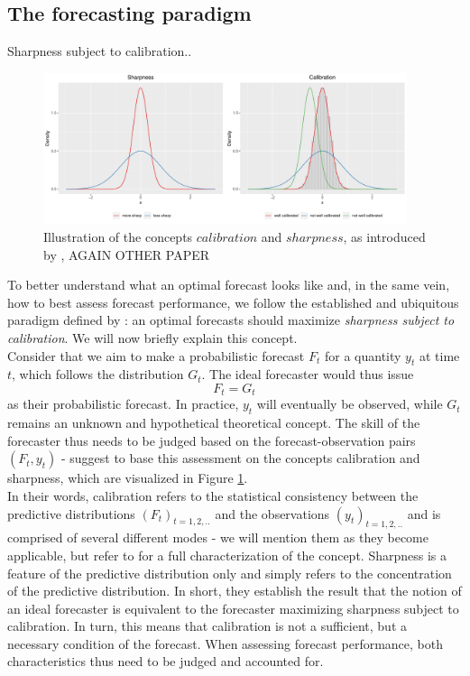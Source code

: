 \subsection{The forecasting paradigm}
Sharpness subject to calibration.\cite{ray_ensemble_2020}.
\begin{figure}
\centering
\includegraphics[width = 0.95\textwidth]{../plots/sharp_calib.pdf}
\caption{Illustration of the concepts $calibration$ and $sharpness$, as introduced by \cite{gneiting_strictly_2007}, AGAIN OTHER PAPER}
\label{fig:sharpcalib}
\end{figure}
To better understand what an optimal forecast looks like and, in the same vein, how to best assess forecast performance, we follow the established and ubiquitous paradigm defined by \cite{gneiting_probabilistic_2007}: an optimal forecasts should maximize \textit{sharpness subject to calibration}. We will now briefly explain this concept.\\
Consider that we aim to make a probabilistic forecast $F_t$ for a quantity $y_t$ at time $t$, which follows the distribution $G_t$. The ideal forecaster would thus issue 
\begin{equation}
	F_t = G_t
\end{equation}
as their probabilistic forecast. In practice, $y_t$ will eventually be observed, while $G_t$ remains an unknown and hypothetical theoretical concept. The skill of the forecaster thus needs to be judged based on the forecast-observation pairs $(F_t, y_t)$ - \cite{gneiting_probabilistic_2007} suggest to base this assessment on the concepts calibration and sharpness, which are visualized in Figure \ref{fig:sharpcalib}. \\
In their words, calibration refers to the statistical consistency between the predictive distributions $(F_t)_{t = 1,2,..}$ and the observations $(y_t)_{t = 1,2,..}$ and is comprised of several different modes - we will mention them as they become applicable, but refer to \cite{gneiting_probabilistic_2007} for a full characterization of the concept. %
Sharpness is a feature of the predictive distribution only and simply refers to the concentration of the predictive distribution. In short, they establish the result that the notion of an ideal forecaster is equivalent to the forecaster maximizing sharpness subject to calibration. In turn, this means that calibration is not a sufficient, but a necessary condition of the forecast. When assessing forecast performance, both characteristics thus need to be judged and accounted for.\\
